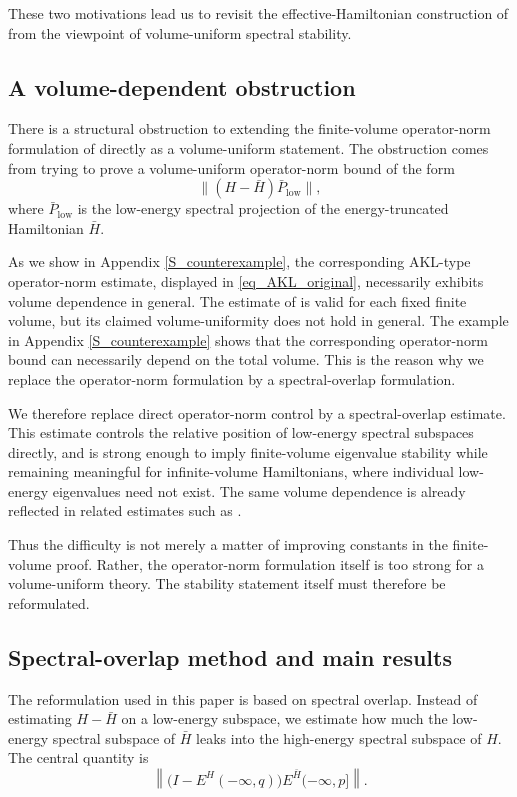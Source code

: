 \documentclass[11pt]{article}
\numberwithin{equation}{section}
\begin{document}
These two motivations lead us to revisit the effective-Hamiltonian construction of \cite{Arad-Kuwahara-Landau 2016} from the viewpoint of volume-uniform spectral stability.

\subsection{A volume-dependent obstruction}
There is a structural obstruction to extending the finite-volume operator-norm formulation of \cite{Arad-Kuwahara-Landau 2016} directly as a volume-uniform statement. The obstruction comes from trying to prove a volume-uniform operator-norm bound of the form
\[
\|(H-\bar{H})\bar{P}_{\mathrm{low}}\|,
\]
where $\bar{P}_{\mathrm{low}}$ is the low-energy spectral projection of the energy-truncated Hamiltonian $\bar{H}$.

As we show in Appendix \ref{S_counterexample}, the corresponding AKL-type operator-norm estimate, displayed in \eqref{eq_AKL_original}, necessarily exhibits volume dependence in general. The estimate of \cite{Arad-Kuwahara-Landau 2016} is valid for each fixed finite volume, but its claimed volume-uniformity does not hold in general. The example in Appendix \ref{S_counterexample} shows that the corresponding operator-norm bound can necessarily depend on the total volume.  This is the reason why we replace the operator-norm formulation by a spectral-overlap formulation.

We therefore replace direct operator-norm control by a spectral-overlap estimate. This estimate controls the relative position of low-energy spectral subspaces directly, and is strong enough to imply finite-volume eigenvalue stability while remaining meaningful for infinite-volume Hamiltonians, where individual low-energy eigenvalues need not exist. The same volume dependence is already reflected in related estimates such as \cite[equation (283)]{Kuwahara-Saito2020}.

Thus the difficulty is not merely a matter of improving constants in the finite-volume proof.  Rather, the operator-norm formulation itself is too strong for a volume-uniform theory. The stability statement itself must therefore be reformulated.

\subsection{Spectral-overlap method and main results}
The reformulation used in this paper is based on spectral overlap. Instead of estimating $H-\bar{H}$ on a low-energy subspace, we estimate how much the low-energy spectral subspace of $\bar{H}$ leaks into the high-energy spectral subspace of $H$. The central quantity is
\[
\left\|\bigl(I-E^H(-\infty,q)\bigr)
E^{\bar{H}}(-\infty,p]\right\|.
\]
\end{document}
